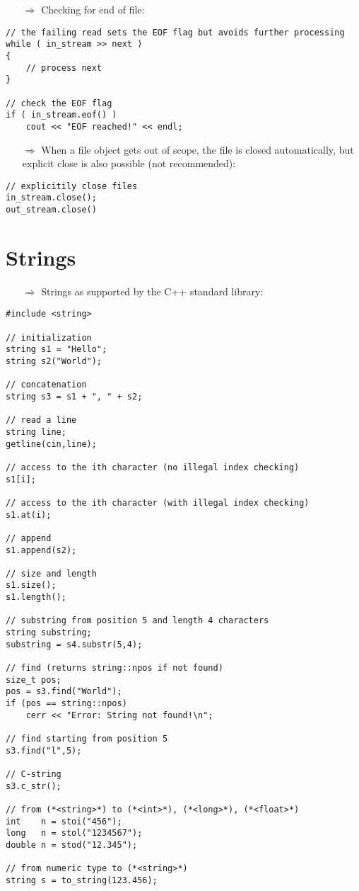 \documentclass[10pt]{article}
\begin{document}
\begin{enumerate}
\item[$\Rightarrow$] Checking for end of file:
\end{enumerate}
\begin{lstlisting}
// the failing read sets the EOF flag but avoids further processing
while ( in_stream >> next )
{
    // process next
}

// check the EOF flag
if ( in_stream.eof() )
    cout << "EOF reached!" << endl;
\end{lstlisting}
\begin{enumerate}
\item[$\Rightarrow$] When a file object gets out of scope, the file is closed automatically, but explicit
close is also possible (not recommended):
\end{enumerate}
\begin{lstlisting}
// explicitily close files
in_stream.close();
out_stream.close()
\end{lstlisting}
%
%
\section{Strings}
\small
\begin{enumerate}
\item[$\Rightarrow$] Strings as supported by the C++ standard library:
\end{enumerate}
\begin{lstlisting}
#include <string>

// initialization
string s1 = "Hello";
string s2("World");

// concatenation
string s3 = s1 + ", " + s2;

// read a line
string line;
getline(cin,line);

// access to the ith character (no illegal index checking)
s1[i];

// access to the ith character (with illegal index checking)
s1.at(i);

// append
s1.append(s2);

// size and length
s1.size();
s1.length();

// substring from position 5 and length 4 characters
string substring;
substring = s4.substr(5,4);

// find (returns string::npos if not found)
size_t pos;
pos = s3.find("World");
if (pos == string::npos)
    cerr << "Error: String not found!\n";

// find starting from position 5
s3.find("l",5);

// C-string
s3.c_str();

// from (*<string>*) to (*<int>*), (*<long>*), (*<float>*)
int    n = stoi("456");
long   n = stol("1234567");
double n = stod("12.345");

// from numeric type to (*<string>*)
string s = to_string(123.456);
\end{lstlisting}
%
%
\end{document}
